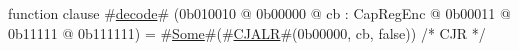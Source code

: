 function clause #\hyperref[sailMIPSzdecode]{decode}# (0b010010 @ 0b00000 @ cb : CapRegEnc @    0b00011 @    0b11111 @ 0b111111) = #\hyperref[sailMIPSzSome]{Some}#(#\hyperref[sailMIPSzCJALR]{CJALR}#(0b00000, cb, false)) /* CJR */
